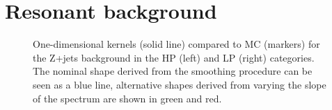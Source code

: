 \section{Resonant background}
\label{app:search3:resbkg}
\begin{figure}[h!]
\centering
{}
\caption{One-dimensional \MVV kernels (solid line) compared to MC (markers) for the Z+jets background in the HP (left) and LP (right) categories. The nominal shape derived from the smoothing procedure can be seen as a blue line, alternative shapes derived from varying the slope of the \MVV spectrum are shown in green and red.}
\label{fig:app:Zjets_mvv}
\end{figure}

